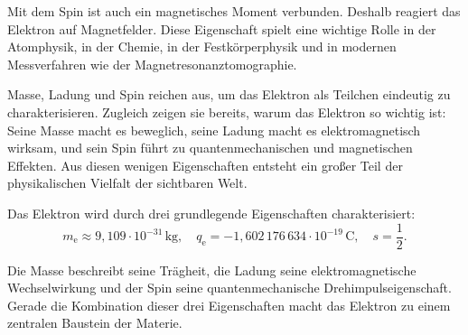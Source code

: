 Mit dem Spin ist auch ein magnetisches Moment verbunden.
Deshalb reagiert das Elektron auf Magnetfelder. Diese Eigenschaft
spielt eine wichtige Rolle in der Atomphysik, in der Chemie, in der
Festkörperphysik und in modernen Messverfahren wie der
Magnetresonanztomographie.

Masse, Ladung und Spin reichen aus, um das Elektron als Teilchen eindeutig zu
charakterisieren. Zugleich zeigen sie bereits, warum das Elektron so wichtig ist:
Seine Masse macht es beweglich, seine Ladung macht es elektromagnetisch wirksam,
und sein Spin führt zu quantenmechanischen und magnetischen Effekten. Aus diesen
wenigen Eigenschaften entsteht ein großer Teil der physikalischen Vielfalt der
sichtbaren Welt.

\begin{PhysicsBox}
	\label{box:grundeigenschaften}
	Das Elektron wird durch drei grundlegende Eigenschaften charakterisiert:
	\[
	m_\mathrm{e} \approx 9{,}109 \cdot 10^{-31}\,\mathrm{kg},
	\quad
	q_\mathrm{e} = -1{,}602\,176\,634 \cdot 10^{-19}\,\mathrm{C},
	\quad
	s = \frac{1}{2}.
	\]
	
	Die Masse beschreibt seine Trägheit, die Ladung seine elektromagnetische
	Wechselwirkung und der Spin seine quantenmechanische Drehimpulseigenschaft.
	Gerade die Kombination dieser drei Eigenschaften macht das Elektron zu einem
	zentralen Baustein der Materie.
\end{PhysicsBox}